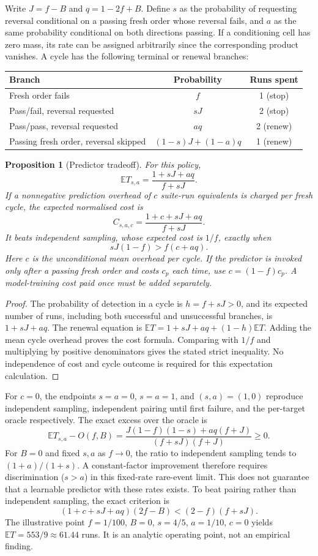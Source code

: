 \documentclass[11pt,a4paper]{article}
\newtheorem{proposition}[theorem]{Proposition}
\theoremstyle{definition}\newtheorem{definition}[theorem]{Definition}
\theoremstyle{remark}\newtheorem{remark}[theorem]{Remark}
\newcommand{\E}{\mathbb E}
\theoremstyle{definition}\newtheorem{xexample}[xtheorem]{Example}\theoremstyle{plain}
\begin{document}
Write $J=f-B$ and $q=1-2f+B$. Define $s$ as the probability of requesting reversal conditional on a passing fresh order whose reversal fails, and $a$ as the same probability conditional on both directions passing. If a conditioning cell has zero mass, its rate can be assigned arbitrarily since the corresponding product vanishes. A cycle has the following terminal or renewal branches:
\begin{center}
\begin{tabular}{@{}lcc@{}}
\toprule
Branch & Probability & Runs spent\\
\midrule
Fresh order fails & $f$ & 1 (stop)\\
Pass/fail, reversal requested & $sJ$ & 2 (stop)\\
Pass/pass, reversal requested & $aq$ & 2 (renew)\\
Passing fresh order, reversal skipped & $(1-s)J+(1-a)q$ & 1 (renew)\\
\bottomrule
\end{tabular}
\end{center}
\begin{proposition}[Predictor tradeoff]
For this policy,
\[
 \E T_{s,a}=\frac{1+sJ+aq}{f+sJ}.
\]
If a nonnegative prediction overhead of $c$ suite-run equivalents is charged per fresh cycle, the expected normalised cost is
\[
 C_{s,a,c}=\frac{1+c+sJ+aq}{f+sJ}.
\]
It beats independent sampling, whose expected cost is $1/f$, exactly when
\[
 sJ(1-f)>f(c+aq).
\]
Here $c$ is the unconditional mean overhead per cycle. If the predictor is invoked only after a passing fresh order and costs $c_p$ each time, use $c=(1-f)c_p$. A model-training cost paid once must be added separately.
\end{proposition}
\begin{proof}
The probability of detection in a cycle is $h=f+sJ>0$, and its expected number of runs, including both successful and unsuccessful branches, is $1+sJ+aq$. The renewal equation is $\E T=1+sJ+aq+(1-h)\E T$. Adding the mean cycle overhead proves the cost formula. Comparing with $1/f$ and multiplying by positive denominators gives the stated strict inequality. No independence of cost and cycle outcome is required for this expectation calculation.
\end{proof}
For $c=0$, the endpoints $s=a=0$, $s=a=1$, and $(s,a)=(1,0)$ reproduce independent sampling, independent pairing until first failure, and the per-target oracle respectively. The exact excess over the oracle is
\[
 \E T_{s,a}-O(f,B)
 =\frac{J(1-f)(1-s)+aq(f+J)}{(f+sJ)(f+J)}\ge0.
\]
For $B=0$ and fixed $s,a$ as $f\to0$, the ratio to independent sampling tends to $(1+a)/(1+s)$. A constant-factor improvement therefore requires discrimination ($s>a$) in this fixed-rate rare-event limit. This does not guarantee that a learnable predictor with these rates exists. To beat pairing rather than independent sampling, the exact criterion is
\[
 (1+c+sJ+aq)(2f-B)<(2-f)(f+sJ).
\]
The illustrative point $f=1/100$, $B=0$, $s=4/5$, $a=1/10$, $c=0$ yields $\E T=553/9\approx61.44$ runs. It is an analytic operating point, not an empirical finding.
\end{document}
